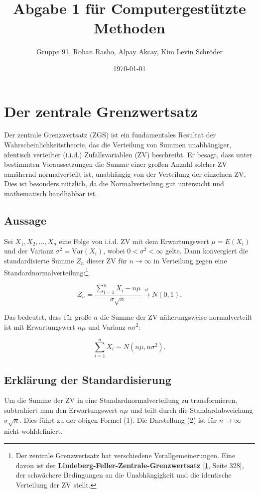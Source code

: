 \documentclass[a4paper,12pt]{article}
\title{Abgabe 1 für Computergestützte Methoden}
\author{Gruppe 91, Rohan Rasho, Alpay Akcay, Kim Levin Schröder}
\date{\today}
\begin{document}
\newpage
\maketitle

\renewcommand{\contentsname}{Inhaltsangabe}
\tableofcontents
\newpage

\section{Der zentrale Grenzwertsatz}
Der zentrale Grenzwertsatz (ZGS) ist ein fundamentales Resultat der Wahrscheinlichkeitstheorie, das die Verteilung von Summen unabhängiger, identisch verteilter (i.i.d.) Zufallsvariablen (ZV) beschreibt. Er besagt, dass unter bestimmten Voraussetzungen die Summe einer großen Anzahl solcher ZV annähernd normalverteilt ist, unabhängig von der Verteilung der einzelnen ZV. Dies ist besonders nützlich, da die Normalverteilung gut untersucht und mathematisch handhabbar ist.

\subsection{Aussage}
Sei $X_1, X_2, \dots, X_n$ eine Folge von i.i.d. ZV mit dem Erwartungswert $\mu = E(X_i)$ und der Varianz $\sigma^2 = \text{Var}(X_i)$, wobei $0 < \sigma^2 < \infty$ gelte. Dann konvergiert die standardisierte Summe $Z_n$ dieser ZV für $n \to \infty$ in Verteilung gegen eine Standardnormalverteilung:\footnote{Der zentrale Grenzwertsatz hat verschiedene Verallgemeinerungen. Eine davon ist der \textbf{Lindeberg-Feller-Zentrale-Grenzwertsatz} [\hyperlink{source1}{1}, Seite 328], der schwächere Bedingungen an die Unabhängigkeit und die identische Verteilung der ZV stellt.}

\begin{equation}
Z_n = \frac{\sum_{i=1}^n X_i - n\mu}{\sigma \sqrt{n}} \xrightarrow{d} N(0, 1).
\end{equation}

\noindent Das bedeutet, dass für große $n$ die Summe der ZV näherungsweise normalverteilt ist mit Erwartungswert $n\mu$ und Varianz $n\sigma^2$:

\begin{equation}
\sum_{i=1}^n X_i \sim N(n\mu, n\sigma^2).
\end{equation}

\subsection{Erklärung der Standardisierung}
Um die Summe der ZV in eine Standardnormalverteilung zu transformieren, subtrahiert man den Erwartungswert $n\mu$ und teilt durch die Standardabweichung $\sigma \sqrt{n}$. Dies führt zu der obigen Formel (1). Die Darstellung (2) ist für $n \to \infty$ nicht wohldefiniert.
\end{document}
